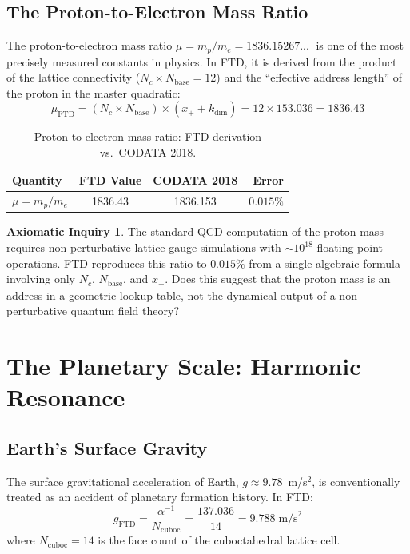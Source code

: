 \documentclass[11pt, letterpaper]{article}
\theoremstyle{definition}
\newtheorem{inquiry}{Axiomatic Inquiry}[section]
\theoremstyle{remark}
\begin{document}
\subsection{The Proton-to-Electron Mass Ratio}

The proton-to-electron mass ratio $\mu = m_p / m_e = 1836.15267...\;$ is one of the most precisely measured constants in physics. In FTD, it is derived from the product of the lattice connectivity ($N_c \times N_{\text{base}} = 12$) and the ``effective address length'' of the proton in the master quadratic:
\begin{equation}
    \mu_{\text{FTD}} = (N_c \times N_{\text{base}}) \times (x_+ + k_{\text{dim}}) = 12 \times 153.036 = \mathbf{1836.43}
\end{equation}

\begin{table}[hbt!]
\centering
\caption{Proton-to-electron mass ratio: FTD derivation vs.\ CODATA 2018.}
\label{tab:proton_mass}
\begin{tabular}{@{}lccr@{}}
\toprule
\textbf{Quantity} & \textbf{FTD Value} & \textbf{CODATA 2018} & \textbf{Error} \\
\midrule
$\mu = m_p / m_e$ & 1836.43 & 1836.153 & $0.015\%$ \\
\bottomrule
\end{tabular}
\end{table}

\begin{inquiry}
The standard QCD computation of the proton mass requires non-perturbative lattice gauge simulations with $\sim 10^{18}$ floating-point operations. FTD reproduces this ratio to $0.015\%$ from a single algebraic formula involving only $N_c$, $N_{\text{base}}$, and $x_+$. Does this suggest that the proton mass is an address in a geometric lookup table, not the dynamical output of a non-perturbative quantum field theory?
\end{inquiry}

\section{The Planetary Scale: Harmonic Resonance}

\subsection{Earth's Surface Gravity}

The surface gravitational acceleration of Earth, $g \approx 9.78$~m/s$^2$, is conventionally treated as an accident of planetary formation history. In FTD:
\begin{equation}
    g_{\text{FTD}} = \frac{\alpha^{-1}}{N_{\text{cuboc}}} = \frac{137.036}{14} = \mathbf{9.788}\;\text{m/s}^2
\end{equation}
where $N_{\text{cuboc}} = 14$ is the face count of the cuboctahedral lattice cell.
\end{document}
